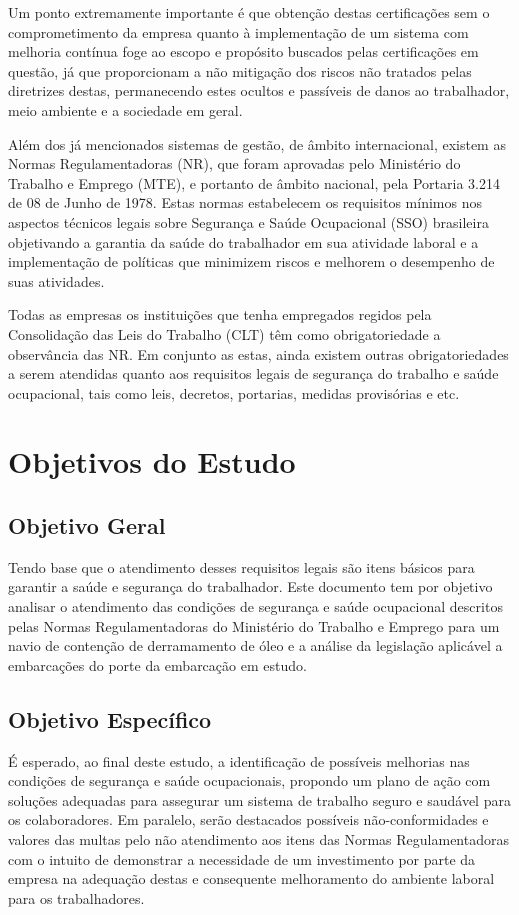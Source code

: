 Um ponto extremamente importante é que obtenção destas certificações sem o comprometimento da empresa quanto à implementação de um sistema com melhoria contínua foge ao escopo e propósito buscados pelas certificações em questão, já que proporcionam a não mitigação dos riscos não tratados pelas diretrizes destas, permanecendo estes ocultos e passíveis de danos ao trabalhador, meio ambiente e a sociedade em geral.

Além dos já mencionados sistemas de gestão, de âmbito internacional, existem as Normas Regulamentadoras (NR), que foram aprovadas pelo Ministério do Trabalho e Emprego (MTE), e portanto de âmbito nacional, pela Portaria 3.214 de 08 de Junho de 1978. Estas normas estabelecem os requisitos mínimos nos aspectos técnicos legais sobre Segurança e Saúde Ocupacional (SSO) brasileira objetivando a garantia da saúde do trabalhador em sua atividade laboral e a implementação de políticas que minimizem riscos e melhorem o desempenho de suas atividades.

Todas as empresas os instituições que tenha empregados regidos pela Consolidação das Leis do Trabalho (CLT) têm como obrigatoriedade a observância das NR. Em conjunto as estas, ainda existem outras obrigatoriedades a serem atendidas quanto aos requisitos legais de segurança do trabalho e saúde ocupacional, tais como leis, decretos, portarias, medidas provisórias e etc.

\section{Objetivos do Estudo}
\subsection{Objetivo Geral}
Tendo base que o atendimento desses requisitos legais são itens básicos para garantir a saúde e segurança do trabalhador. Este documento tem por objetivo analisar o atendimento das condições de segurança e saúde ocupacional descritos pelas Normas Regulamentadoras do Ministério do Trabalho e Emprego para um navio de contenção de derramamento de óleo e a análise da legislação aplicável a embarcações do porte da embarcação em estudo.
\subsection{Objetivo Específico}
É esperado, ao final deste estudo, a identificação de possíveis melhorias nas condições de segurança e saúde ocupacionais, propondo um plano de ação com soluções adequadas para assegurar um sistema de trabalho seguro e saudável para os colaboradores.
Em paralelo, serão destacados possíveis não-conformidades e valores das multas pelo não atendimento aos itens das Normas Regulamentadoras com o intuito de demonstrar a necessidade de um investimento por parte da empresa na adequação destas e consequente melhoramento do ambiente laboral para os trabalhadores.

